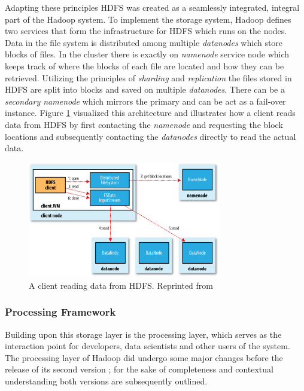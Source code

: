 Adapting these principles \ac{HDFS} was created as a seamlessly integrated, integral part of the Hadoop system. 
To implement the storage system, 
Hadoop defines two services that form the infrastructure for \ac{HDFS} which runs on the nodes.
Data in the file system is distributed among multiple \emph{datanodes} which store blocks of files.
In the cluster there is exactly on \emph{namenode} service node which keeps track of where the blocks of each file are located and how they can be retrieved.
Utilizing the principles of \emph{sharding} and \emph{replication}
the files stored in \ac{HDFS} are split into blocks and saved on multiple \emph{datanodes}. 
There can be a \emph{secondary namenode} which  mirrors the primary and can be act as a fail-over instance.
Figure \ref{fig:hdfs_read} visualized this architecture 
and illustrates how a client reads data from \ac{HDFS} 
by first contacting the \emph{namenode} and requesting the block locations 
and subsequently contacting the \emph{datanodes} directly to read the actual data.

\begin{figure}[th]
     {\centering\includegraphics[width=0.75\textwidth]{img/hddg_0302.png}\par}
	\caption{\label{fig:hdfs_read}A client reading data from HDFS. Reprinted from \autocite[][Chap.~3]{white2015hadoop}}
\end{figure}

\subsubsection{Processing Framework}

Building upon this storage layer is the processing layer, which serves as the interaction point for developers, data scientists and other users of the system. The processing layer of Hadoop did undergo some major changes before the release of its second version \autocite[p.~5]{vavilapalli2013apache}; for the sake of completeness and contextual understanding both versions are subsequently outlined.

